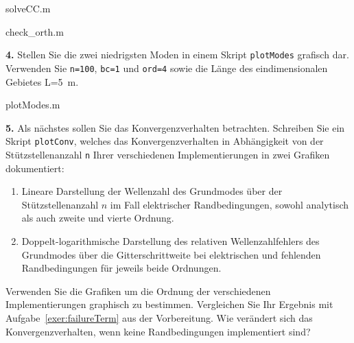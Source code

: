 \documentclass[Protokollheft.tex]{subfiles}
\begin{document}
 {solveCC.m}


 {check_orth.m}

        \begin{framed}
	\noindent \textbf{4.} Stellen Sie die zwei niedrigsten Moden in einem Skript \lstinline{plotModes} grafisch dar.
        Verwenden Sie \lstinline{n=100}, \lstinline{bc=1} und \lstinline{ord=4} sowie die Länge des eindimensionalen Gebietes L=\SI{5}{m}.\label{exer:plotModes}
\end{framed}

 {plotModes.m}

        \begin{framed}
	\noindent \textbf{5.} Als nächstes sollen Sie das Konvergenzverhalten betrachten. Schreiben Sie ein Skript \lstinline{plotConv}, welches das Konvergenzverhalten in Abhängigkeit von der Stützstellenanzahl \lstinline{n}
                    Ihrer verschiedenen Implementierungen in zwei Grafiken dokumentiert:
                    \begin{enumerate}
                    \item Lineare Darstellung der Wellenzahl des Grundmodes über der Stützstellenanzahl $n$ im Fall elektrischer Randbedingungen, sowohl analytisch als auch zweite und vierte Ordnung.
                    \item Doppelt-logarithmische Darstellung des relativen Wellenzahlfehlers des Grundmodes  über die Gitterschrittweite bei elektrischen und fehlenden Randbedingungen für jeweils beide Ordnungen.
                    \end{enumerate}
                    Verwenden Sie die Grafiken um die Ordnung der verschiedenen Implementierungen graphisch zu bestimmen. Vergleichen Sie Ihr Ergebnis
mit Aufgabe~\ref{exer:failureTerm} aus der Vorbereitung.  Wie verändert sich das Konvergenzverhalten, wenn keine Randbedingungen implementiert sind?\label{exer:plotConv}
\end{framed}
\end{document}
